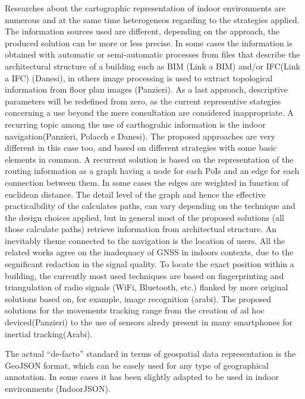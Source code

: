 \documentclass[]{article}
\begin{document}
Researches about the cartographic representation of indoor environments
are numerous and at the same time heterogeneos regarding to the
strategies applied. The information sources used are different,
depending on the approach, the produced solution can be more or less
precise. In some cases the information is obtained with automatic or
semi-automatic processes from files that describe the architectural
structure of a building such as BIM (Link a BIM) and/or IFC(Link a IFC)
(Danesi), in others image processing is used to extract topological
information from floor plan images (Panzieri). As a last approach,
descriptive parameters will be redefined from zero, as the current
representive stategies concerning a use beyond the mere consultation are
considered inappropriate. A recurring topic among the use of
carthograhic information is the indoor navigation(Panzieri, Polacch e
Danesi). The proposed approaches are very different in this case too,
and based on different strategies with some basic elements in common. A
recurrent solution is based on the representation of the routing
information as a graph having a node for each PoIs and an edge for each
connection between them. In some cases the edges are weighted in
function of euclidean distance. The detail level of the graph and hence
the effective practicalbility of the calculates paths, can vary
depending on the technique and the design choices applied, but in
general most of the proposed solutions (all those calculate paths)
retrieve information from architectual structure. An inevitably theme
connected to the navigation is the location of users. All the related
works agree on the inadequacy of GNSS in indoors contexts, due to the
segnificant redaction in the signal quality. To locate the exact
position within a building, the currently most used techniques are based
on fingerprinting and triangulation of radio signals (WiFi, Bluetooth,
etc.) flanked by more original solutions based on, for example, image
recognition (arabi). The proposed solutions for the movements tracking
range from the creation of ad hoc deviced(Panzieri) to the use of
sensors alredy present in many smartphones for inertial tracking(Arabi).

The actual ``de-facto'' standard in terms of geospatial data
representation is the GeoJSON format, which can be easely used for any
type of geographical annotation. In some cases it has been slightly
adapted to be used in indoor environments (IndoorJSON).
\end{document}
